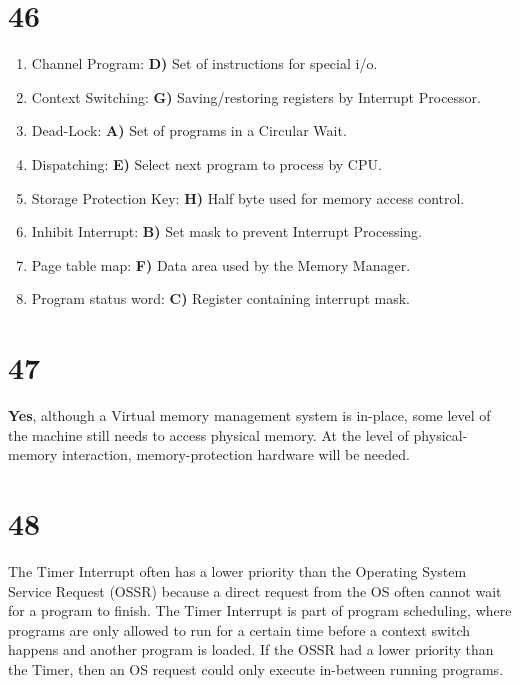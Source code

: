\documentclass[a4paper,11pt]{article}
\begin{document}
\section*{46}
\begin{enumerate}
  \item Channel Program: {\bf D)} Set of instructions for special i/o.
  \item Context Switching: {\bf G)} Saving/restoring registers by Interrupt Processor.
  \item Dead-Lock:  {\bf A)} Set of programs in a Circular Wait.
  \item Dispatching:  {\bf E)} Select next program to process by CPU.
  \item Storage Protection Key:  {\bf H)} Half byte used for memory access control.
  \item Inhibit Interrupt:  {\bf B)} Set mask to prevent Interrupt Processing.
  \item Page table map:  {\bf F)} Data area used by the Memory Manager.
  \item Program status word:  {\bf C)} Register containing interrupt mask.
\end{enumerate}



\section*{47}
{\bf Yes}, although a Virtual memory management system is in-place, some level of the machine still needs to access physical memory.  At the level of physical-memory interaction, memory-protection hardware will be needed.


\section*{48}
The Timer Interrupt often has a lower priority than the Operating System Service Request (OSSR) because a direct request from the OS often cannot wait for a program to finish.  The Timer Interrupt is part of program scheduling, where programs are only allowed to run for a certain time before a context switch happens and another program is loaded.  If the OSSR had a lower priority than the Timer, then an OS request could only execute in-between running programs.  


\end{document}
